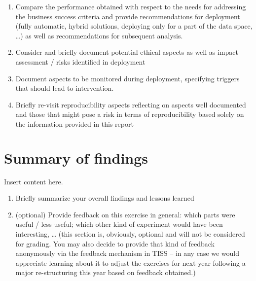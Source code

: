 \documentclass[sigchi]{acmart}
\def\tightlist{}
\begin{document}
\begin{enumerate}
\def\labelenumi{\alph{enumi}.}
\tightlist
\item
  Compare the performance obtained with respect to the needs for addressing the business success criteria and provide recommendations for deployment (fully automatic, hybrid solutions, deploying only for a part of the data space, \ldots) as well as recommendations for subsequent analysis.
\item
  Consider and briefly document potential ethical aspects as well as impact assessment / risks identified in deployment
\item
  Document aspects to be monitored during deployment, specifying triggers that should lead to intervention.
\item
  Briefly re-visit reproducibility aspects reflecting on aspects well documented and those that might pose a risk in terms of reproducibility based solely on the information provided in this report
\end{enumerate}

\hypertarget{summary-of-findings}{%
\section{Summary of findings}\label{summary-of-findings}}

Insert content here.

\begin{enumerate}
\def\labelenumi{\alph{enumi}.}
\tightlist
\item
  Briefly summarize your overall findings and lessons learned
\item
  (optional) Provide feedback on this exercise in general: which parts were useful / less useful; which other kind of experiment would have been interesting, \ldots{} (this section is, obviously, optional and will not be considered for grading. You may also decide to provide that kind of feedback anonymously via the feedback mechanism in TISS -- in any case we would appreciate learning about it to adjust the exercises for next year following a major re-structuring this year based on feedback obtained.)
\end{enumerate}



\end{document}
